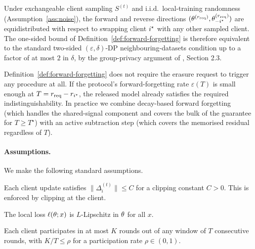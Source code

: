 \begin{remark}
\label{rem:two-sided}
Under exchangeable client sampling $S^{(t)}$ and i.i.d.\ local-training randomness
(Assumption~\ref{ass:noise}), the forward and reverse directions
$(\theta^{(r_\mathrm{req})}, \theta_{-i^{\star}}^{(r_\mathrm{req})})$ are equidistributed
with respect to swapping client $i^{\star}$ with any other sampled client. The one-sided
bound of Definition~\ref{def:forward-forgetting} is therefore equivalent to the standard
two-sided $(\varepsilon, \delta)$-DP neighbouring-datasets condition up to a factor of
at most $2$ in $\delta$, by the group-privacy argument of \cite{dwork2014book}, Section
2.3.
\end{remark}

\begin{remark}
Definition~\ref{def:forward-forgetting} does not require the erasure request to trigger
any procedure at all. If the protocol's forward-forgetting rate $\varepsilon(T)$ is
small enough at $T = r_{\mathrm{req}} - r_{i^{\star}}$, the released model already
satisfies the required indistinguishability. In practice we combine decay-based forward
forgetting (which handles the shared-signal component and covers the bulk of the
guarantee for $T \geq T^{\star}$) with an active subtraction step (which covers the
memorised residual regardless of $T$).
\end{remark}

\paragraph{Assumptions.}
We make the following standard assumptions.

\begin{assumption}
\label{ass:clipping}
Each client update satisfies $\|\Delta_i^{(t)}\| \leq C$ for a clipping constant $C > 0$.
This is enforced by clipping at the client.
\end{assumption}

\begin{assumption}
\label{ass:lipschitz}
The local loss $\ell(\theta; x)$ is $L$-Lipschitz in $\theta$ for all $x$.
\end{assumption}

\begin{assumption}
\label{ass:participation}
Each client participates in at most $K$ rounds out of any window of $T$ consecutive
rounds, with $K/T \leq \rho$ for a participation rate $\rho \in (0, 1)$.
\end{assumption}


